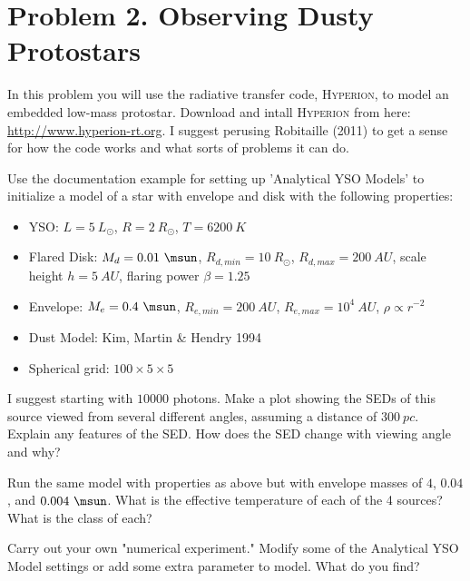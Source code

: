 \documentclass[11pt]{article}
\newenvironment{tight_enumerate}{
    \begin{enumerate}[label=(\alph*)]
    \setlength{\itemsep}{3pt}
    \setlength{\parskip}{0pt}}
    {\end{enumerate}}
\begin{document}
\newpage
\section*{Problem 2. Observing Dusty Protostars}
In this problem you will use the radiative transfer code, \textsc{Hyperion}, to model an embedded low-mass protostar. Download and intall \textsc{Hyperion} from here: \url{http://www.hyperion-rt.org}. I suggest perusing Robitaille (2011) to get a sense for how the code works and what sorts of problems it can do.

\begin{tight_enumerate}
\item Use the documentation example for setting up 'Analytical YSO Models' to initialize a model of a star with envelope and disk with the following properties:
\begin{itemize}
\item YSO: $L = 5\ L_{\odot}$, $R = 2\ R_{\odot}$, $T = 6200\ \si{K}$
\item Flared Disk: $M_{d} = 0.01\ \si{\msun}$, $R_{d,min} = 10\ R_{\odot}$, $R_{d,max} = 200\ \si{AU}$, scale height $h = 5\ \si{AU}$, flaring power $\beta = 1.25$
\item Envelope: $M_{e} = 0.4\ \si{\msun}$, $R_{e,min} = 200\ \si{AU}$, $R_{e,max} = 10^{4}\ \si{AU}$, $\rho \propto r^{-2}$
\item Dust Model: Kim, Martin \& Hendry 1994
\item Spherical grid: $100 \times 5 \times 5$
\end{itemize}
I suggest starting with $10000$ photons. Make a plot showing the SEDs of this source viewed from several different angles, assuming a distance of $300\ \si{pc}$. Explain any features of the SED. How does the SED change with viewing angle and why?

\item Run the same model with properties as above but with envelope masses of $4$, $0.04$, and $0.004\ \si{\msun}$. What is the effective temperature of each of the 4 sources? What is the class of each?

\item Carry out your own "numerical experiment." Modify some of the Analytical YSO Model settings or add some extra parameter to model. What do you find?
\end{tight_enumerate}
\end{document}
